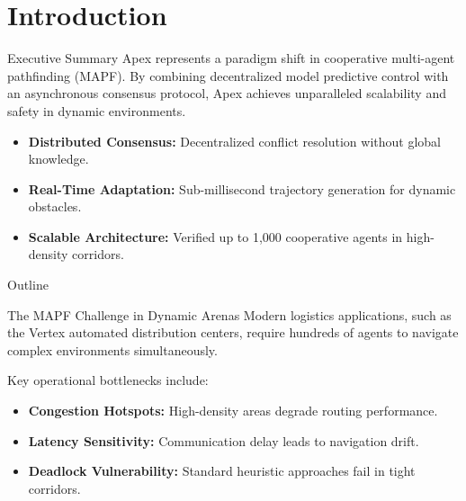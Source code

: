 \section{Introduction}

\begin{frame}{Executive Summary}
    Apex represents a paradigm shift in cooperative multi-agent pathfinding (MAPF). By combining decentralized model predictive control with an asynchronous consensus protocol, Apex achieves unparalleled scalability and safety in dynamic environments.
    
    \vspace{0.4cm}
    \begin{itemize}
        \item \textbf{Distributed Consensus:} Decentralized conflict resolution without global knowledge.
        \item \textbf{Real-Time Adaptation:} Sub-millisecond trajectory generation for dynamic obstacles.
        \item \textbf{Scalable Architecture:} Verified up to 1,000 cooperative agents in high-density corridors.
    \end{itemize}
\end{frame}

\begin{frame}{Outline}
    \tableofcontents
\end{frame}

\begin{frame}{The MAPF Challenge in Dynamic Arenas}
    Modern logistics applications, such as the Vertex automated distribution centers, require hundreds of agents to navigate complex environments simultaneously.
    
    \vspace{0.3cm}
    Key operational bottlenecks include:
    \begin{itemize}
        \item\textbf{Congestion Hotspots:} High-density areas degrade routing performance.
        \item\textbf{Latency Sensitivity:} Communication delay leads to navigation drift.
        \item\textbf{Deadlock Vulnerability:} Standard heuristic approaches fail in tight corridors.
    \end{itemize}
\end{frame}
